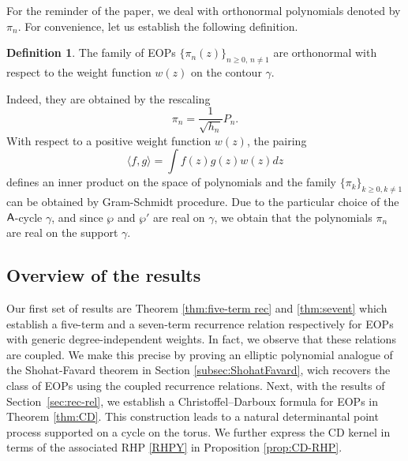 \documentclass[11pt,a4paper]{article}
\theoremstyle{definition}
\newtheorem{definition}[theorem]{Definition}
\numberwithin{equation}{section}
\numberwithin{theorem}{section}
\begin{document}
For the reminder of the paper, we deal with orthonormal polynomials denoted by $\pi_n$. For convenience, let us establish the following definition.
\begin{definition}\label{def:orthonormalEOPs}
 The family of EOPs \( \{\pi_n(z)\}_{n \geq 0,\, n \neq 1} \) are orthonormal with respect to the weight function \( w(z) \) on the contour \( \gamma \).
\end{definition}
Indeed, they are obtained by the rescaling
\begin{equation}
    \pi_{n}=\frac{1}{\sqrt{h_n}}P_n.
\end{equation}
With respect to a positive weight function $w(z)$, the pairing
\begin{equation}
    \langle f,g\rangle =\int f(z)g(z)w(z)dz
\end{equation}
defines an inner product on the space of polynomials and the family $\{\pi_k\}_{k\geq0,k\neq 1}$ can be obtained by Gram-Schmidt procedure. Due to the particular choice of the $\sf A$-cycle $\gamma$, and since  $\wp$ and $\wp'$ are real on $\gamma$, we obtain that the polynomials $\pi_n$ are real on the support $\gamma$. 





\subsection{Overview of the results}


Our first set of results are Theorem \ref{thm:five-term rec} and \ref{thm:sevent} which establish a five-term and a seven-term recurrence relation respectively for EOPs with generic degree-independent weights. In fact, we observe that these relations are coupled. We make this precise by proving an elliptic polynomial analogue of the Shohat-Favard theorem in Section \ref{subsec:ShohatFavard}, wich recovers the class of EOPs using the coupled recurrence relations.  Next, with the results of Section~\ref{sec:rec-rel}, we establish a Christoffel--Darboux formula for EOPs in Theorem \ref{thm:CD}. This construction leads to a natural determinantal point process supported on a cycle on the torus. We further express the CD kernel in terms of the associated RHP \ref{RHPY} in Proposition \ref{prop:CD-RHP}. 
\end{document}
